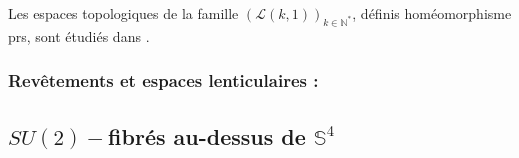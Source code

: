 \begin{rema}
Les espaces topologiques de la famille $(\mathcal{L}(k,1))_{k\in\mathbb{N}^{\ast}}$, d\'efinis  hom\'eomorphisme prs, %
sont \'etudi\'es dans \cite{Lens}.
\end{rema}

\subsubsection{Rev\^etements et espaces lenticulaires :}

\subsection{$SU(2)-$fibr\'es au-dessus de $\mathbb{S}^4$}

